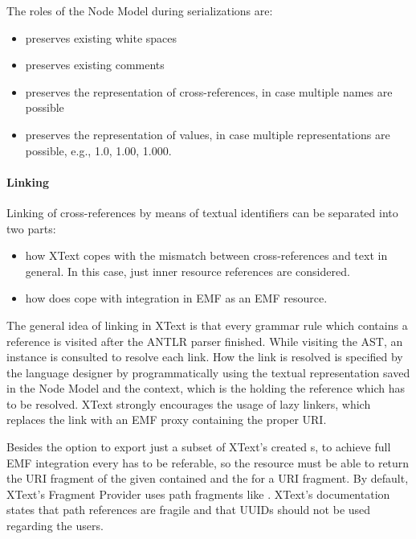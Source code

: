The roles of the Node Model during serializations are:
\begin{itemize}
	\item preserves existing white spaces
	\item preserves existing comments
	\item preserves the representation of cross-references, in case multiple names are possible
	\item preserves the representation of values, in case multiple representations are possible, e.g., 1.0, 1.00, 1.000.
\end{itemize}

\paragraph{Linking}
\label{sec:xtextarch:Linking}
Linking of cross-references by means of textual identifiers can be separated into two parts:
\begin{itemize}
	\item how XText copes with the mismatch between cross-references and text in general. In this case, just inner resource references are considered. 
	\item how does  cope with integration in EMF as an EMF resource.
\end{itemize}
The general idea of linking in XText is that every grammar rule which contains a reference is visited after the ANTLR parser finished. While visiting the AST, an  instance is consulted to resolve each link. How the link is resolved is specified by the language designer by programmatically using the textual representation saved in the Node Model and the context, which is the  holding the reference which has to be resolved. XText strongly encourages the usage of lazy linkers, which replaces the link with an EMF proxy containing the proper URI.

Besides the option to export just a subset of XText's created s, to achieve full EMF integration every  has to be referable, so the resource must be able to return the URI fragment of the given contained  and the  for a URI fragment. By default, XText's Fragment Provider uses path fragments like . XText's documentation states that path references are fragile and that UUIDs should not be used regarding the users. 

